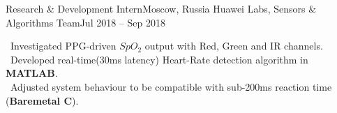 \resumeSubheading
    {Research \& Development Intern}{Moscow, Russia}
    {Huawei Labs, Sensors \& Algorithms Team}{Jul 2018 -- Sep 2018}
    \begin{itemize}[leftmargin=0in, label={}]
        \small{\item{
            {\textbullet \ Investigated PPG-driven $SpO_{2}$ output with Red, Green and IR channels.}\\
            {\textbullet \ Developed real-time(30ms latency) Heart-Rate detection algorithm in \textbf{MATLAB}.}\\
            {\textbullet \ Adjusted system behaviour to be compatible with sub-200ms reaction time (\textbf{Baremetal C}). }\\
        }}
    \end{itemize}